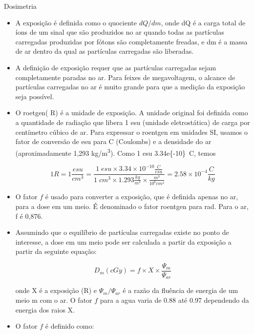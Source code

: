 \documentclass[11pt,a4paper]{article}
\newcounter{exemplo}
\begin{document}
\begin{exemplo}

    \textcolor{CarnationPink}{Dosimetria}
    \begin{itemize}
        \item A exposição é definida como o quociente $dQ/dm$, onde dQ é a carga total de íons de um sinal que são produzidos no ar quando todas as partículas carregadas produzidas por fótons são completamente freadas, e dm é a massa de ar dentro da qual as partículas carregadas são liberadas. 
        
        \item A definição de exposição requer que as partículas carregadas sejam completamente paradas no ar. Para feixes de megavoltagem, o alcance de partículas carregadas no ar é muito grande para que a medição da exposição seja possível.
        
        \item O roetgen( R) é a unidade de exposição. A unidade original foi definida como a quantidade de radiação que libera 1 esu (unidade eletrostática) de carga por centímetro cúbico de ar. Para expressar o roentgen em unidades SI, usamos o fator de conversão de esu para C (Coulombs) e a densidade do ar (aproximadamente 1,293 \unit{kg/m^3}). Como 1 esu  \qty{3.34e{-10}}{C}, temos
        
        $$1R = 1 \frac{esu}{cm^3} = \frac{1\;esu \times 3.34 \times 10^{-10} \frac{C}{esu}}{1\;cm^3 \times 1.293 \frac{kg}{m^3} \times \frac{m^3}{10^6 cm^3}} = 2.58 \times 10^{-4} \frac{C}{kg}$$

        \item O fator $f$ é usado para converter a exposição, que é definida apenas no ar, para a dose em um meio. É denominado o fator roentgen para rad. Para o ar, f é 0,876.
        
        \item Assumindo que o equilíbrio de partículas carregadas existe no ponto de interesse, a dose em um meio pode ser calculada a partir da exposição a partir da seguinte equação:
        
            $$D_m(cGy) = f \times X \times \frac{\Psi_m}{\Psi_{ar}}$$

        onde X é a exposição (R) e $\Psi_{m}/\Psi_{ar}$ é a razão da fluência de energia de um meio m com o ar. O fator $f$ para a agua varia de 0.88 até 0.97 dependendo da energia dos raios X.


        \item O fator $f$ é definido como:
        

\end{itemize}
\end{exemplo}
\end{document}
